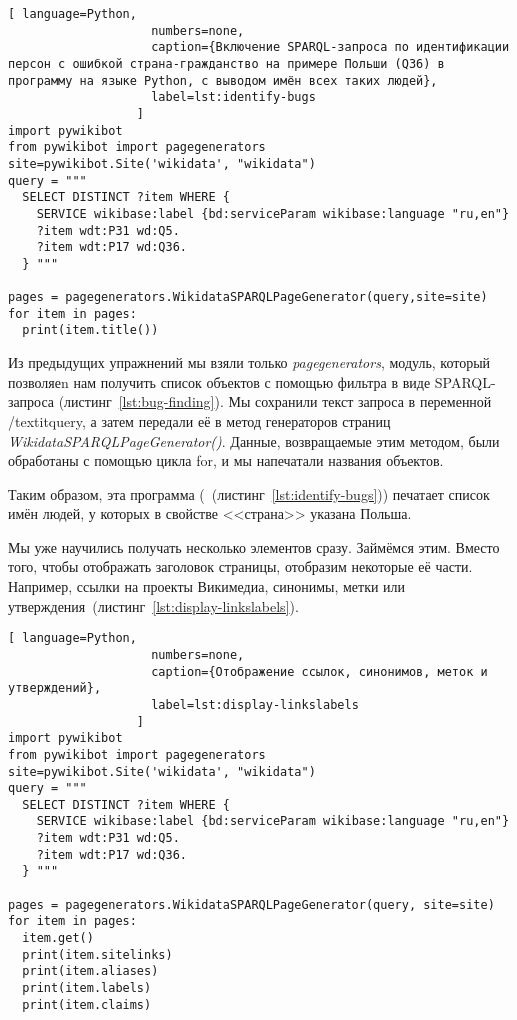 \begin{fullwidth}
\begin{lstlisting}[ language=Python,
                    numbers=none,
                    caption={Включение SPARQL-запроса по идентификации персон с ошибкой страна-гражданство на примере Польши (Q36) в программу на языке Python, с выводом имён всех таких людей},
                    label=lst:identify-bugs
                  ]
import pywikibot
from pywikibot import pagegenerators
site=pywikibot.Site('wikidata', "wikidata")
query = """
  SELECT DISTINCT ?item WHERE {
    SERVICE wikibase:label {bd:serviceParam wikibase:language "ru,en"}
    ?item wdt:P31 wd:Q5.
    ?item wdt:P17 wd:Q36.
  } """

pages = pagegenerators.WikidataSPARQLPageGenerator(query,site=site)
for item in pages:
  print(item.title())
\end{lstlisting}    
\end{fullwidth}

Из предыдущих упражнений мы взяли только \textit{pagegenerators}, модуль, который позволяеn нам получить список объектов с помощью фильтра в виде SPARQL-запроса (листинг~\ref{lst:bug-finding}). Мы сохранили текст запроса в переменной /textit{query}, а затем передали её в метод генераторов страниц \textit{WikidataSPARQLPageGenerator()}. Данные, возвращаемые этим методом, были обработаны с помощью цикла for, и мы напечатали названия объектов.

Таким образом, эта программа (~(листинг~\ref{lst:identify-bugs})) печатает список имён людей, у которых в свойстве <<страна>> указана Польша.

Мы уже научились получать несколько элементов сразу. Займёмся этим. Вместо того, чтобы отображать заголовок страницы, отобразим некоторые её части. Например, ссылки на проекты Викимедиа, синонимы, метки или утверждения~(листинг~\ref{lst:display-linkslabels}).

\begin{lstlisting}[ language=Python,
                    numbers=none,
                    caption={Отображение ссылок, синонимов, меток и утверждений},
                    label=lst:display-linkslabels
                  ]
import pywikibot
from pywikibot import pagegenerators
site=pywikibot.Site('wikidata', "wikidata")
query = """
  SELECT DISTINCT ?item WHERE {
    SERVICE wikibase:label {bd:serviceParam wikibase:language "ru,en"}
    ?item wdt:P31 wd:Q5.
    ?item wdt:P17 wd:Q36.
  } """

pages = pagegenerators.WikidataSPARQLPageGenerator(query, site=site)
for item in pages:
  item.get()
  print(item.sitelinks)
  print(item.aliases)
  print(item.labels)
  print(item.claims)
\end{lstlisting} 

